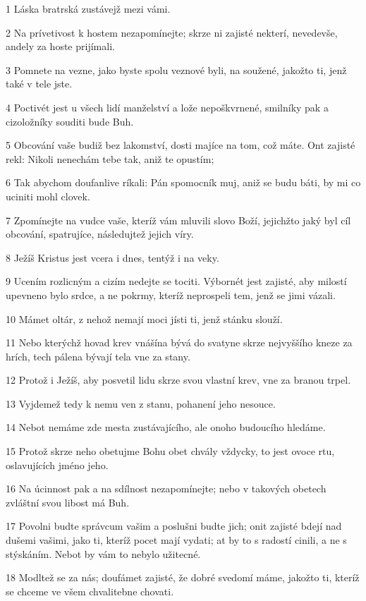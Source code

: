 \par 1 Láska bratrská zustávejž mezi vámi.
\par 2 Na prívetivost k hostem nezapomínejte; skrze ni zajisté nekterí, nevedevše, andely za hoste prijímali.
\par 3 Pomnete na vezne, jako byste spolu veznové byli, na soužené, jakožto ti, jenž také v tele jste.
\par 4 Poctivét jest u všech lidí manželství a lože nepoškvrnené, smilníky pak a cizoložníky souditi bude Buh.
\par 5 Obcování vaše budiž bez lakomství, dosti majíce na tom, což máte. Ont zajisté rekl: Nikoli nenechám tebe tak, aniž te opustím;
\par 6 Tak abychom doufanlive ríkali: Pán spomocník muj, aniž se budu báti, by mi co uciniti mohl clovek.
\par 7 Zpomínejte na vudce vaše, kteríž vám mluvili slovo Boží, jejichžto jaký byl cíl obcování, spatrujíce, následujtež jejich víry.
\par 8 Ježíš Kristus jest vcera i dnes, tentýž i na veky.
\par 9 Ucením rozlicným a cizím nedejte se tociti. Výbornét jest zajisté, aby milostí upevneno bylo srdce, a ne pokrmy, kteríž neprospeli tem, jenž se jimi vázali.
\par 10 Mámet oltár, z nehož nemají moci jísti ti, jenž stánku slouží.
\par 11 Nebo kterýchž hovad krev vnášína bývá do svatyne skrze nejvyššího kneze za hrích, tech pálena bývají tela vne za stany.
\par 12 Protož i Ježíš, aby posvetil lidu skrze svou vlastní krev, vne za branou trpel.
\par 13 Vyjdemež tedy k nemu ven z stanu, pohanení jeho nesouce.
\par 14 Nebot nemáme zde mesta zustávajícího, ale onoho budoucího hledáme.
\par 15 Protož skrze neho obetujme Bohu obet chvály vždycky, to jest ovoce rtu, oslavujících jméno jeho.
\par 16 Na úcinnost pak a na sdílnost nezapomínejte; nebo v takových obetech zvláštní svou libost má Buh.
\par 17 Povolni budte správcum vašim a poslušni budte jich; onit zajisté bdejí nad dušemi vašimi, jako ti, kteríž pocet mají vydati; at by to s radostí cinili, a ne s stýskáním. Nebot by vám to nebylo užitecné.
\par 18 Modltež se za nás; doufámet zajisté, že dobré svedomí máme, jakožto ti, kteríž se chceme ve všem chvalitebne chovati.
